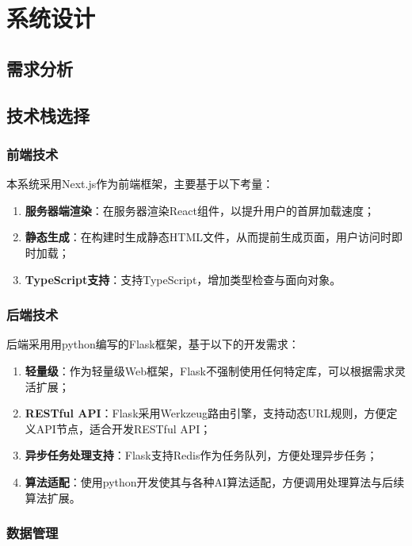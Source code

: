 \chapter{系统设计}

\section{需求分析}



\section{技术栈选择}

\subsection{前端技术}

本系统采用Next.js作为前端框架，主要基于以下考量：
\begin{enumerate}
    \item \textbf{服务器端渲染}：在服务器渲染React组件，以提升用户的首屏加载速度；
    \item \textbf{静态生成}：在构建时生成静态HTML文件，从而提前生成页面，用户访问时即时加载；
    \item \textbf{TypeScript支持}：支持TypeScript，增加类型检查与面向对象。
\end{enumerate}

\subsection{后端技术}

后端采用用python编写的Flask框架，基于以下的开发需求：
\begin{enumerate}
    \item \textbf{轻量级}：作为轻量级Web框架，Flask不强制使用任何特定库，可以根据需求灵活扩展；
    \item \textbf{RESTful API}：Flask采用Werkzeug路由引擎，支持动态URL规则，方便定义API节点，适合开发RESTful API；
    \item \textbf{异步任务处理支持}：Flask支持Redis作为任务队列，方便处理异步任务；
    \item \textbf{算法适配}：使用python开发使其与各种AI算法适配，方便调用处理算法与后续算法扩展。
\end{enumerate}

\subsection{数据管理}

